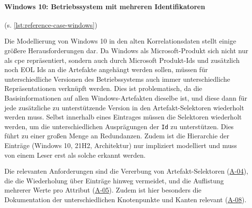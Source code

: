 \paragraph{Windows 10: Betriebssystem mit mehreren Identifikatoren}\label{par:reference-case-windows} (s. \autoref{lst:reference-case-windows})

Die Modellierung von Windows 10 in den alten Korrelationsdaten stellt einige größere Herausforderungen dar.
Da Windows als Microsoft-Produkt sich nicht nur als \acrshort{cpe} repräsentiert, sondern auch durch Microsoft Produkt-Ids und zusätzlich noch EOL Ids an die Artefakte angehängt werden sollen, müssen für unterschiedliche Versionen des Betriebssystems auch immer unterschiedliche Repräsentationen verknüpft werden.
Dies ist problematisch, da die Basisinformationen auf allen Windows-Artefakten dieselbe ist, und diese dann für jede zusätzliche zu unterstützende Version in den Artefakt-Selektoren wiederholt werden muss.
Selbst innerhalb eines Eintrages müssen die Selektoren wiederholt werden, um die unterschiedlichen Ausprägungen der \texttt{Id} zu unterstützen.
Dies führt zu einer großen Menge an Redundanzen.
Zudem ist die Hierarchie der Einträge (Windows 10, 21H2, Architektur) nur impliziert modelliert und muss von einem Leser erst als solche erkannt werden.

Die relevanten Anforderungen sind die Vererbung von Artefakt-Selektoren (\hyperref[subsec:req-selektor-inheritance]{A-04}), die die Wiederholung über Einträge hinweg vermeidet, und die Auflistung mehrerer Werte pro Attribut (\hyperref[subsec:req-multiple-attribute-values]{A-05}).
Zudem ist hier besonders die Dokumentation der unterschiedlichen Knotenpunkte und Kanten relevant (\hyperref[subsec:req-reason-format]{A-08}).

